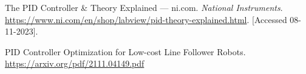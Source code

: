\begin{thebibliography}{9}
    The {P}{I}{D} {C}ontroller \& {T}heory {E}xplained --- ni.com.
    \textit{National Instruments}.
    \url{https://www.ni.com/en/shop/labview/pid-theory-explained.html}.
    [Accessed 08-11-2023].

    PID Controller Optimization for Low-cost Line
Follower Robots.
    \url{https://arxiv.org/pdf/2111.04149.pdf}
\end{thebibliography}
